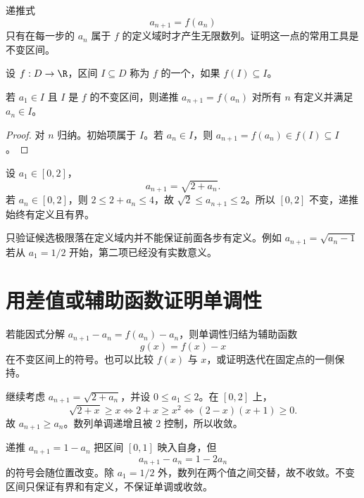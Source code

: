 递推式
\[
 a_{n+1}=f(a_n)
\]
只有在每一步的 \(a_n\) 属于 \(f\) 的定义域时才产生无限数列。证明这一点的常用工具是不变区间。

\begin{definition}
设 \(f:D\to\R\)，区间 \(I\subseteq D\) 称为 \(f\) 的一个，如果 \(f(I)\subseteq I\)。
\end{definition}

\begin{proposition}
若 \(a_1\in I\) 且 \(I\) 是 \(f\) 的不变区间，则递推 \(a_{n+1}=f(a_n)\) 对所有 \(n\) 有定义并满足 \(a_n\in I\)。
\end{proposition}

\begin{proof}
对 \(n\) 归纳。初始项属于 \(I\)。若 \(a_n\in I\)，则 \(a_{n+1}=f(a_n)\in f(I)\subseteq I\)。
\end{proof}

\begin{example}
设 \(a_1\in[0,2]\)，
\[
 a_{n+1}=\sqrt{2+a_n}.
\]
若 \(a_n\in[0,2]\)，则 \(2\le2+a_n\le4\)，故
\(\sqrt2\le a_{n+1}\le2\)。所以 \([0,2]\) 不变，递推始终有定义且有界。
\end{example}

只验证候选极限落在定义域内并不能保证前面各步有定义。例如 \(a_{n+1}=\sqrt{a_n-1}\) 若从 \(a_1=1/2\) 开始，第二项已经没有实数意义。

\section{用差值或辅助函数证明单调性}

若能因式分解 \(a_{n+1}-a_n=f(a_n)-a_n\)，则单调性归结为辅助函数
\[
 g(x)=f(x)-x
\]
在不变区间上的符号。也可以比较 \(f(x)\) 与 \(x\)，或证明迭代在固定点的一侧保持。

\begin{example}
继续考虑 \(a_{n+1}=\sqrt{2+a_n}\)，并设 \(0\le a_1\le2\)。在 \([0,2]\) 上，
\[
 \sqrt{2+x}\ge x
 \Longleftrightarrow 2+x\ge x^2
 \Longleftrightarrow (2-x)(x+1)\ge0.
\]
故 \(a_{n+1}\ge a_n\)。数列单调递增且被 \(2\) 控制，所以收敛。
\end{example}

\begin{example}[差值符号不固定]
递推 \(a_{n+1}=1-a_n\) 把区间 \([0,1]\) 映入自身，但
\[
 a_{n+1}-a_n=1-2a_n
\]
的符号会随位置改变。除 \(a_1=1/2\) 外，数列在两个值之间交替，故不收敛。不变区间只保证有界和有定义，不保证单调或收敛。
\end{example}

